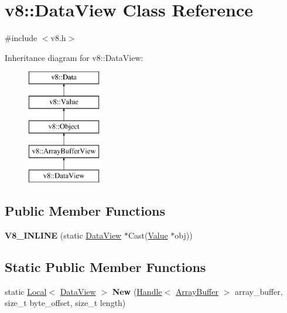 \hypertarget{classv8_1_1_data_view}{}\section{v8\+:\+:Data\+View Class Reference}
\label{classv8_1_1_data_view}


{\ttfamily \#include $<$v8.\+h$>$}

Inheritance diagram for v8\+:\+:Data\+View\+:\begin{figure}[H]
\begin{center}
\leavevmode
\includegraphics[height=5.000000cm]{classv8_1_1_data_view}
\end{center}
\end{figure}
\subsection*{Public Member Functions}
\begin{DoxyCompactItemize}
\item 
\hypertarget{classv8_1_1_data_view_af258eb645afa18a112319f025383fbe5}{}{\bfseries V8\+\_\+\+I\+N\+L\+I\+N\+E} (static \hyperlink{classv8_1_1_data_view}{Data\+View} $\ast$Cast(\hyperlink{classv8_1_1_value}{Value} $\ast$obj))\label{classv8_1_1_data_view_af258eb645afa18a112319f025383fbe5}

\end{DoxyCompactItemize}
\subsection*{Static Public Member Functions}
\begin{DoxyCompactItemize}
\item 
\hypertarget{classv8_1_1_data_view_a5157c044dbb50669bc2977ea7482aa32}{}static \hyperlink{classv8_1_1_local}{Local}$<$ \hyperlink{classv8_1_1_data_view}{Data\+View} $>$ {\bfseries New} (\hyperlink{classv8_1_1_handle}{Handle}$<$ \hyperlink{classv8_1_1_array_buffer}{Array\+Buffer} $>$ array\+\_\+buffer, size\+\_\+t byte\+\_\+offset, size\+\_\+t length)\label{classv8_1_1_data_view_a5157c044dbb50669bc2977ea7482aa32}

\end{DoxyCompactItemize}


